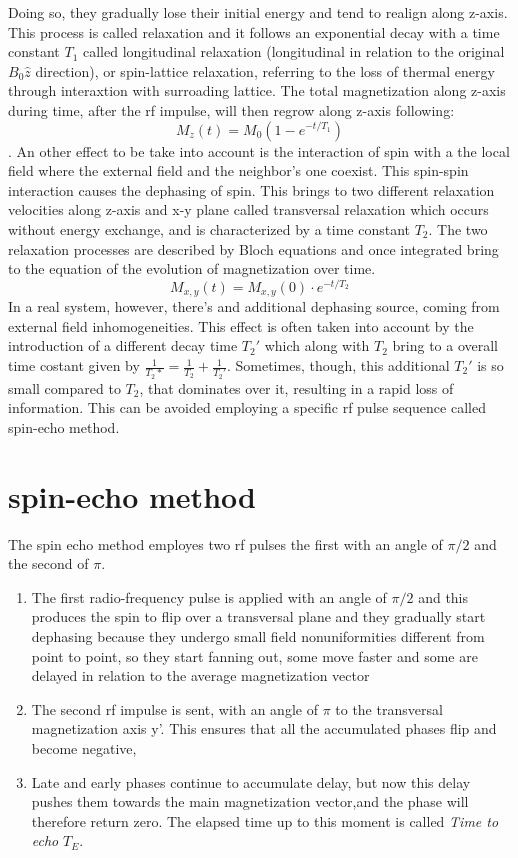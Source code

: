 \documentclass[11pt]{report}
\begin{document}
Doing so, they gradually lose their initial energy and tend to realign along z-axis.
This process is called relaxation and it follows an exponential decay with a time constant $T_1$ called longitudinal relaxation (longitudinal in relation to the original $B_0 \hat z$ direction), or spin-lattice relaxation, referring to the loss of thermal energy through interaxtion with surroading lattice. The total magnetization along z-axis during time, after the rf impulse, will then regrow along z-axis following:
\begin{equation}
M_z(t) = M_0 (1-e^{-t/T_1})
\end{equation}.
An other effect to be take into account is the interaction of spin with a the local field where the external field and the neighbor's one coexist. This spin-spin interaction causes the dephasing of spin. This brings to two different relaxation velocities along z-axis and x-y plane called transversal relaxation which occurs without energy exchange, and is characterized by a time constant $T_2$. The two relaxation processes are described by Bloch equations and once integrated bring to the equation of the evolution of magnetization over time.
\begin{equation}
M_{x, y}(t) = M_{x,y}(0)\cdot e^{-t/T_2}
\end{equation}
In a real system, however, there's and additional dephasing source, coming from external field inhomogeneities.
This effect is often taken into account by the introduction of a different decay time $T_2'$ which along with $T_2$ bring to a overall time costant given by $\frac{1}{T_2*} = \frac{1}{T_2}+\frac{1}{T_2'}$.
Sometimes, though, this additional $T_2'$ is so small compared to $T_2$, that dominates over it, resulting in a rapid loss of information.
This can be avoided employing a specific rf pulse sequence called spin-echo method.
\section{spin-echo method}
The spin echo method employes two rf pulses the first with an angle of $\pi/2$ and the second of $\pi$.
\begin{enumerate}
\item The first radio-frequency pulse is applied with an angle of $\pi/2$ and this produces the spin to flip over a transversal plane and they gradually start dephasing because they undergo small field nonuniformities different from point to point, so they start fanning out, some move faster and some are delayed in relation to the average magnetization vector
\item The second rf impulse is sent, with an angle of $\pi$ to the transversal magnetization axis y'. This ensures that all the accumulated phases flip and become negative,
\item Late and early phases continue to accumulate delay, but now this delay pushes them towards the main magnetization vector,and the phase will therefore return zero. The elapsed time up to this moment is called \emph{Time to echo} $T_E$.
\end{enumerate}
\end{document}
